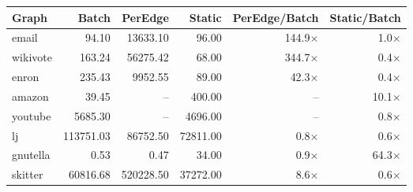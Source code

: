 \begin{tabular}{lrrrrr}
\toprule
Graph & Batch & PerEdge & Static & PerEdge/Batch & Static/Batch \\
\midrule
email & 94.10 & 13633.10 & 96.00 & 144.9$\times$ & 1.0$\times$ \\
wikivote & 163.24 & 56275.42 & 68.00 & 344.7$\times$ & 0.4$\times$ \\
enron & 235.43 & 9952.55 & 89.00 & 42.3$\times$ & 0.4$\times$ \\
amazon & 39.45 & -- & 400.00 & -- & 10.1$\times$ \\
youtube & 5685.30 & -- & 4696.00 & -- & 0.8$\times$ \\
lj & 113751.03 & 86752.50 & 72811.00 & 0.8$\times$ & 0.6$\times$ \\
gnutella & 0.53 & 0.47 & 34.00 & 0.9$\times$ & 64.3$\times$ \\
skitter & 60816.68 & 520228.50 & 37272.00 & 8.6$\times$ & 0.6$\times$ \\
\bottomrule
\end{tabular}
